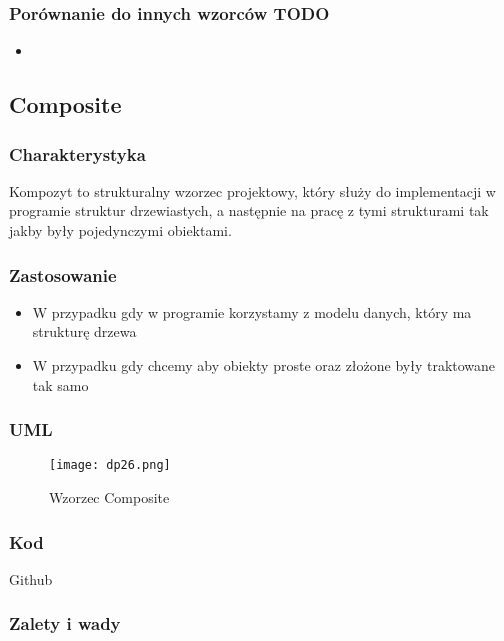 \documentclass[a4paper,15pt]{article}
\begin{document}
\subsubsection{Porównanie do innych wzorców TODO}
\begin{itemize}
\item
\end{itemize}

\newpage
\subsection{Composite}

\subsubsection{Charakterystyka}
Kompozyt to strukturalny wzorzec projektowy, który służy do implementacji w programie struktur drzewiastych, a następnie na pracę z tymi strukturami tak jakby były pojedynczymi obiektami. 

\subsubsection{Zastosowanie}
\begin{itemize}
\item W przypadku gdy w programie korzystamy z modelu danych, który ma strukturę drzewa
\item W przypadku gdy chcemy aby obiekty proste oraz złożone były traktowane tak samo
\end{itemize}

\subsubsection{UML}

\begin{figure}[H]
\centering
  \texttt{[image: dp26.png]}
  \caption{Wzorzec Composite}
\end{figure}

\subsubsection{Kod}
Github

\subsubsection{Zalety i wady}
\end{document}
